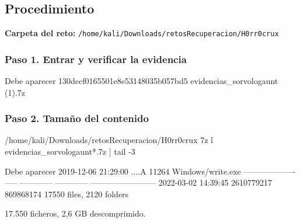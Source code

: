 \documentclass[11pt,a4paper]{article}
\begin{document}
\subsection{Procedimiento}

\noindent\textbf{Carpeta del reto:} \texttt{/\allowbreak{}home/\allowbreak{}kali/\allowbreak{}Downloads/\allowbreak{}retosRecuperacion/\allowbreak{}H0rr0crux}


\subsubsection*{Paso 1. Entrar y verificar la evidencia}
\begin{salida}{Debe aparecer}
130decf0165501e8e53148035b057bd5  evidencias_sorvologaunt (1).7z
\end{salida}

\subsubsection*{Paso 2. Tamaño del contenido}
\begin{comando}{/home/kali/Downloads/retosRecuperacion/H0rr0crux}
7z l evidencias_sorvologaunt*.7z | tail -3
\end{comando}
\begin{salida}{Debe aparecer}
2019-12-06 21:29:00 ....A        11264               Windows/write.exe
------------------- ----- ------------ ------------  ------------------------
2022-03-02 14:39:45         2610779217    869868174  17550 files, 2120 folders
\end{salida}
\begin{nota}17.550 ficheros, 2,6 GB descomprimido.\end{nota}
\end{document}
